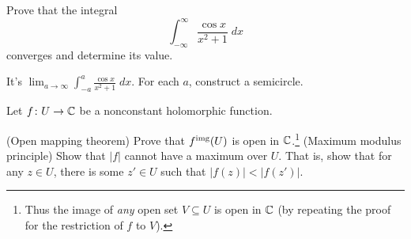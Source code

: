 \begin{problem}
	\yod
	Prove that the integral
	\[ \int_{-\infty}^{\infty} \frac{\cos x}{x^2+1} \; dx \]
	converges and determine its value.
	\begin{hint}
		It's $\lim_{a \to \infty} \int_{-a}^{a} \frac{\cos x}{x^2+1} \; dx$.
		For each $a$, construct a semicircle.
	\end{hint}
\end{problem}

\begin{sproblem}
	\gim
	Let $f \colon U \to \mathbb C$ be a nonconstant holomorphic function.
	\begin{enumerate}[(a)]
		\ii (Open mapping theorem)
		Prove that $f^{\text{img}}(U)$ is open in $\mathbb C$.\footnote{Thus
			the image of \emph{any}
			open set $V \subseteq U$ is open in $\mathbb C$
			(by repeating the proof for the restriction of $f$ to $V$).}
		\ii (Maximum modulus principle)
		Show that $\left\lvert f \right\rvert$
		cannot have a maximum over $U$.
		That is, show that for any $z \in U$,
		there is some $z' \in U$ such that
		$\left\lvert f(z) \right\rvert < \left\lvert f(z') \right\rvert$.
	\end{enumerate}
\end{sproblem}
